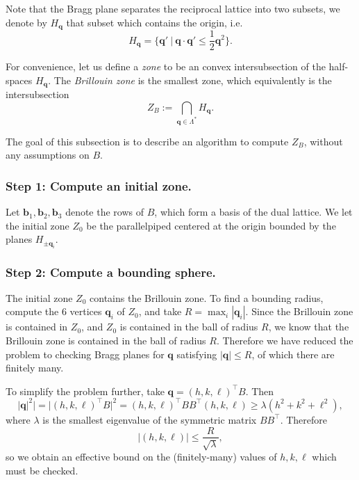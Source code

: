 \documentclass[11pt,a4paper]{article}
\def\v#1{\bm{{#1}}}
\def\tr{^\intercal}
\def\q{{\v{q}}}
\begin{document}
Note that the Bragg plane separates the reciprocal lattice into two subsets, we denote by $H_\q$ that subset
which contains the origin, i.e.
\begin{equation} H_\q = \{ \q' \ | \ \q \cdot \q' \leq \frac{1}{2} \q^2 \}. \end{equation}


For convenience, let us define a \emph{zone} to be an convex intersubsection of the half-spaces $H_\q$.
The \emph{Brillouin zone} is the smallest zone, which equivalently is the intersubsection
\begin{equation} Z_B :=\bigcap_{\q \in \Lambda^\ast} H_\q. \end{equation}

The goal of this subsection is to describe an algorithm to compute $Z_B$, without any assumptions on $B$.

\subsubsection{Step 1: Compute an initial zone.}

Let $\v{b}_1, \v{b}_2, \v{b}_3$ denote the rows of $B$, which form a basis of the dual lattice.
We let the initial zone $Z_0$ be the parallelpiped centered at the origin bounded by the planes
$H_{\pm \q_i}$.

\subsubsection{Step 2: Compute a bounding sphere.}

The initial zone $Z_0$ contains the Brillouin zone. To find a bounding radius, compute the 6 vertices $\q_i$ of $Z_0$,
and take $R = \max_i |\q_i|$. Since the Brillouin zone is contained in $Z_0$, and $Z_0$ is contained in the ball of radius $R$,
we know that the Brillouin zone is contained in the ball of radius $R$. Therefore we have reduced the problem to checking
Bragg planes for $\q$ satisfying $|\q| \leq R$, of which there are finitely many.

To simplify the problem further, take $\q = (h,k,\ell)\tr B$. Then
\begin{equation}
   |\q|^2|
   = |(h,k,\ell)\tr B|^2
   = (h,k,\ell)\tr B B\tr (h,k,\ell)
   \geq \lambda (h^2 + k^2 + \ell^2),
\end{equation}
where $\lambda$ is the smallest eigenvalue of the symmetric matrix $B B\tr$. Therefore
\begin{equation} |(h,k,\ell)| \leq \frac{R}{\sqrt\lambda}, \end{equation}
so we obtain an effective bound on the (finitely-many) values of $h,k,\ell$ which must be checked.
\end{document}
